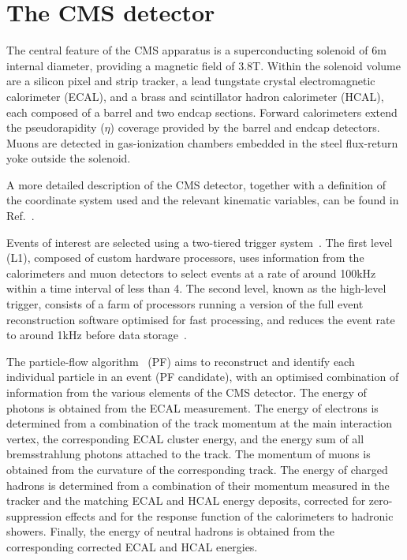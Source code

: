 \documentclass[11pt,a4paper,cmspaper,final,collab]{cms-tdr}
\begin{document}
\section{The CMS detector}
\label{sec:detector}
The central feature of the CMS apparatus is a superconducting solenoid of 6\unit{m} internal diameter, providing a magnetic field of 3.8\unit{T}. Within the solenoid volume are a silicon pixel and strip tracker, a lead tungstate crystal electromagnetic calorimeter (ECAL), and a brass and scintillator hadron calorimeter (HCAL), each composed of a barrel and two endcap sections. Forward calorimeters extend the pseudorapidity ($\eta$) coverage provided by the barrel and endcap detectors. Muons are detected in gas-ionization chambers embedded in the steel flux-return yoke outside the solenoid.

A more detailed description of the CMS detector, 
together with a definition of the coordinate system used and the relevant kinematic variables, 
can be found in Ref.~\cite{CMSdetector}.

Events of interest are selected using a two-tiered trigger system~\cite{Khachatryan:2016bia}. 
The first level (L1), composed of custom hardware processors, 
uses information from the calorimeters and muon detectors to select events 
at a rate of around 100\unit{kHz} within a time interval of less than 4\mus. 
The second level, known as the high-level trigger, 
consists of a farm of processors running a version of the full event reconstruction software 
optimised for fast processing, and reduces the event rate to around 1\unit{kHz} before data storage~\cite{CMS_HLT}.

The particle-flow algorithm~\cite{ParticleFlow} (PF) aims to reconstruct 
and identify each individual particle in an event (PF candidate), 
with an optimised combination of information from the various elements of the CMS detector. 
The energy of photons is obtained from the ECAL measurement.
The energy of electrons is determined from a combination of the track momentum at the main interaction vertex, the corresponding ECAL cluster energy, and the energy sum of all bremsstrahlung photons attached to the track.
The momentum of muons is obtained from the curvature of the corresponding track. 
The energy of charged hadrons is determined from a combination of their momentum 
measured in the tracker and the matching ECAL and HCAL energy deposits, 
corrected for zero-suppression effects 
and for the response function of the calorimeters to hadronic showers. 
Finally, the energy of neutral hadrons is obtained 
from the corresponding corrected ECAL and HCAL energies.
\end{document}
